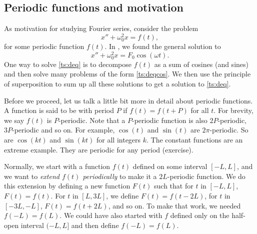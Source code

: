 

\subsection{Periodic functions and motivation}

As motivation for studying Fourier series, consider the problem
\begin{equation} \label{ts:deq}
x'' + \omega_0^2 x = f(t) ,
\end{equation}
for some periodic function $f(t)$.
In , we found the general solution to
\begin{equation} \label{ts:deqcos}
x'' + \omega_0^2 x = F_0 \cos ( \omega t) .
\end{equation}
One way to solve \eqref{ts:deq} is to
decompose $f(t)$ as a sum of cosines (and sines) and then
solve many problems of the form \eqref{ts:deqcos}.  We then use
the principle of superposition to sum up all these solutions
to get a solution to \eqref{ts:deq}.

Before we proceed, let us talk a little bit more in detail about
periodic functions.
A function is said to be \emph{} with period $P$ if
$f(t) = f(t+P)$ for all $t$.  For brevity, we say $f(t)$ is $P$-periodic.
Note that a $P$-periodic function is also $2P$-periodic, $3P$-periodic
and so on.
For example, $\cos (t)$ and $\sin (t)$ are
$2\pi$-periodic.  So are $\cos (kt)$ and $\sin (kt)$ for all integers $k$.  The
constant functions are an extreme example.  They are periodic for any period
(exercise).

Normally, we start with a function $f(t)$ defined on some interval $[-L,L]$,
and we want to
\emph{extend $f(t)$ periodically}
to make it
a $2L$-periodic function.  We do this extension
by defining a new function $F(t)$
such that for $t$ in $[-L,L]$, $F(t) = f(t)$.  For $t$ in $[L,3L]$,
we define $F(t) = f(t-2L)$, for $t$ in $[-3L,-L]$, $F(t) = f(t+2L)$, and
so on.
To make that work, we needed $f(-L) = f(L)$.
We could have also started with $f$
defined only on the half-open interval $(-L,L]$ and then define $f(-L) = f(L)$.

